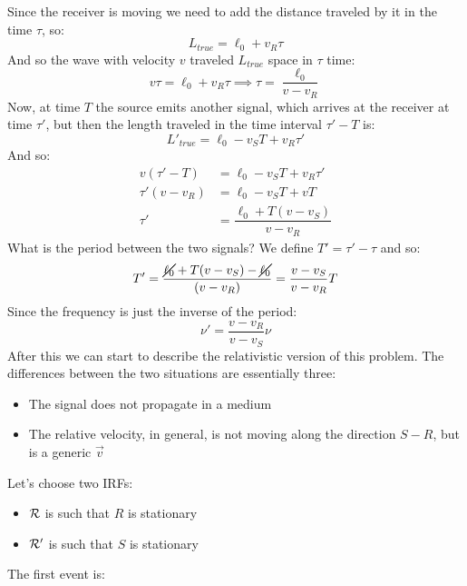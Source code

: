Since the receiver is moving we need to add the distance traveled by it in the time $\tau$, so:
\begin{equation}
  L_{true} = \ell_0 + v_{R}\tau
\end{equation}
And so the wave with velocity $v$ traveled $L_{true}$ space in $\tau$ time:
\begin{equation}
  v\tau = \ell_0 + v_{R}\tau \implies \tau = \dfrac{\ell_0}{v-v_{R}}
\end{equation}
Now, at time $T$ the source emits another signal, which arrives at the receiver at time $\tau'$, but then the length traveled in the time interval $\tau'-T$ is:
\begin{equation}
  L'_{true} = \ell_0 - v_{S}T + v_{R}\tau'
\end{equation}
And so:
\begin{equation}
  \begin{split}
    v(\tau'-T) &= \ell_0 - v_{S}T + v_{R}\tau' \\[8pt]
    \tau'(v-v_{R}) &= \ell_0 -v_{S}T + vT \\[8pt]
    \tau' &= \dfrac{\ell_0 +T(v-v_{S})}{v-v_{R}}
  \end{split}
\end{equation}
What is the period between the two signals? We define $T' = \tau' - \tau$ and so:
\begin{equation}
  T' = \dfrac{\cancel{\ell_0} +T(v-v_{S}) - \cancel{\ell_0}}{(v-v_{R})} = \dfrac{v-v_{S}}{v-v_{R}}T
\end{equation}
Since the frequency is just the inverse of the period:
\begin{equation}
  \boxed{\nu' = \dfrac{v-v_{R}}{v-v_{S}}\nu}
\end{equation}
After this we can start to describe the relativistic version of this problem. The differences between the two situations are essentially three:
\begin{itemize}
  \item The signal does not propagate in a medium
  \item The relative velocity, in general, is not moving along the direction $S-R$, but is a generic $\vec{v}$
\end{itemize}
Let's choose two IRFs:
\begin{itemize}
  \item $\mathcal{R}$ is such that $R$ is stationary
  \item $\mathcal{R'}$ is such that $S$ is stationary
\end{itemize}
The first event is:
